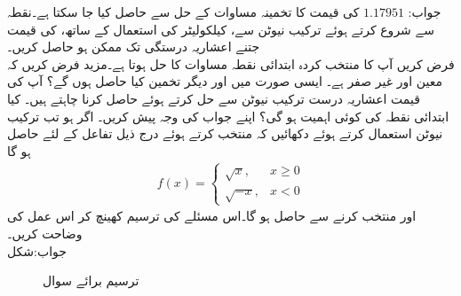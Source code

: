 جواب:\quad
$1.17951$
 کی قیمت کا تخمینہ مساوات  کے حل سے حاصل کیا جا سکتا ہے۔نقطہ  سے شروع کرتے ہوئے ترکیب نیوٹن  سے، کیلکولیٹر کی استعمال کے ساتھ،   کی قیمت جتنے اعشاریہ درستگی تک ممکن ہو حاصل کریں۔ 
\\
فرض کریں آپ کا منتخب کردہ ابتدائی نقطہ مساوات  کا حل ہوتا ہے۔مزید فرض کریں کہ  معین اور غیر صفر ہے۔ ایسی صورت میں  اور دیگر تخمین کیا حاصل ہوں گے؟ 
آپ  کی قیمت  اعشاریہ درست ترکیب نیوٹن سے  حل کرتے ہوئے حاصل کرنا چاہتے ہیں۔ کیا ابتدائی نقطہ کی کوئی اہمیت ہو گی؟ اپنے جواب کی وجہ پیش کریں۔
\quad
اگر  ہو تب ترکیب نیوٹن استعمال کرتے ہوئے دکھائیں کہ  منتخب کرتے ہوئے درج ذیل تفاعل کے لئے  حاصل ہو گا
\begin{align*}
f(x)=
\begin{cases}
\sqrt{x},&x\ge 0\\
\sqrt{-x},&x<0
\end{cases}
\end{align*}
اور  منتخب کرنے سے  حاصل ہو گا۔اس مسئلے کی ترسیم کھینچ کر اس عمل کی وضاحت کریں۔\\
جواب:\quad شکل 
\begin{figure}
\centering
{}
\caption{ترسیم برائے سوال }
\label{شکل_سوال_استعمال_ارتعاش}
\end{figure}
